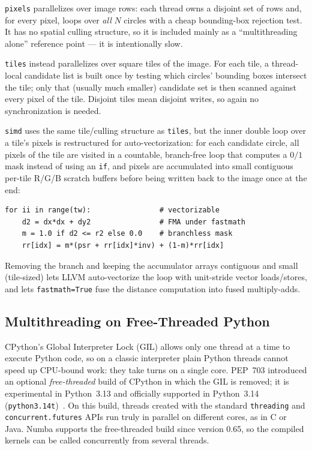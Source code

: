 \documentclass[10pt,twocolumn,letterpaper]{article}
\begin{document}
\texttt{pixels} parallelizes over image rows: each
thread owns a disjoint set of rows and, for every pixel, loops over \emph{all}
$N$ circles with a cheap bounding-box rejection test. It has no spatial
culling structure, so it is included mainly as a ``multithreading alone''
reference point — it is intentionally slow.

\texttt{tiles} instead parallelizes over square tiles of the image. For each
tile, a thread-local candidate list is built once by testing which circles'
bounding boxes intersect the tile; only that (usually much smaller) candidate
set is then scanned against every pixel of the tile. Disjoint tiles mean
disjoint writes, so again no synchronization is needed.

\texttt{simd} uses the same tile/culling structure as \texttt{tiles}, but the
inner double loop over a tile's pixels is restructured for auto-vectorization:
for each candidate circle, all pixels of the tile are visited in a countable,
branch-free loop that computes a $0/1$ mask instead of using an \texttt{if},
and pixels are accumulated into small contiguous per-tile R/G/B scratch
buffers before being written back to the image once at the end:

\begin{lstlisting}
for ii in range(tw):                # vectorizable
    d2 = dx*dx + dy2                # FMA under fastmath
    m = 1.0 if d2 <= r2 else 0.0    # branchless mask
    rr[idx] = m*(psr + rr[idx]*inv) + (1-m)*rr[idx]
\end{lstlisting}

Removing the branch and keeping the accumulator arrays contiguous and small
(tile-sized) lets LLVM auto-vectorize the loop with unit-stride vector
loads/stores, and lets \texttt{fastmath=True} fuse the distance computation
into fused multiply-adds.

\subsection{Multithreading on Free-Threaded Python}
\label{sec:nogil}

CPython's Global Interpreter Lock (GIL) allows only one thread at a time to
execute Python code, so on a classic interpreter plain Python threads cannot
speed up CPU-bound work: they take turns on a single core. PEP~703 introduced
an optional \emph{free-threaded} build of CPython in which the GIL is
removed; it is experimental in Python~3.13 and officially supported in
Python~3.14 (\texttt{python3.14t})~\cite{slides}. On this build, threads
created with the standard \texttt{threading} and
\texttt{concurrent.futures} APIs run truly in parallel on different cores,
as in C or Java. Numba supports the free-threaded build since version 0.65,
so the compiled kernels can be called concurrently from several threads.
\end{document}
